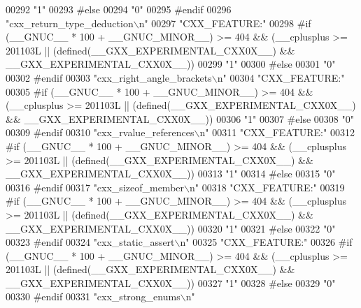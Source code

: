 \begin{DoxyCode}
00292 \textcolor{stringliteral}{"1"}
00293 \textcolor{preprocessor}{#else}
00294 \textcolor{stringliteral}{"0"}
00295 \textcolor{preprocessor}{#endif}
00296 \textcolor{stringliteral}{"cxx\_return\_type\_deduction\(\backslash\)n"}
00297 \textcolor{stringliteral}{"CXX\_FEATURE:"}
00298 \textcolor{preprocessor}{#if (\_\_GNUC\_\_ * 100 + \_\_GNUC\_MINOR\_\_) >= 404 && (\_\_cplusplus >= 201103L ||
       (defined(\_\_GXX\_EXPERIMENTAL\_CXX0X\_\_) && \_\_GXX\_EXPERIMENTAL\_CXX0X\_\_))}
00299 \textcolor{stringliteral}{"1"}
00300 \textcolor{preprocessor}{#else}
00301 \textcolor{stringliteral}{"0"}
00302 \textcolor{preprocessor}{#endif}
00303 \textcolor{stringliteral}{"cxx\_right\_angle\_brackets\(\backslash\)n"}
00304 \textcolor{stringliteral}{"CXX\_FEATURE:"}
00305 \textcolor{preprocessor}{#if (\_\_GNUC\_\_ * 100 + \_\_GNUC\_MINOR\_\_) >= 404 && (\_\_cplusplus >= 201103L ||
       (defined(\_\_GXX\_EXPERIMENTAL\_CXX0X\_\_) && \_\_GXX\_EXPERIMENTAL\_CXX0X\_\_))}
00306 \textcolor{stringliteral}{"1"}
00307 \textcolor{preprocessor}{#else}
00308 \textcolor{stringliteral}{"0"}
00309 \textcolor{preprocessor}{#endif}
00310 \textcolor{stringliteral}{"cxx\_rvalue\_references\(\backslash\)n"}
00311 \textcolor{stringliteral}{"CXX\_FEATURE:"}
00312 \textcolor{preprocessor}{#if (\_\_GNUC\_\_ * 100 + \_\_GNUC\_MINOR\_\_) >= 404 && (\_\_cplusplus >= 201103L ||
       (defined(\_\_GXX\_EXPERIMENTAL\_CXX0X\_\_) && \_\_GXX\_EXPERIMENTAL\_CXX0X\_\_))}
00313 \textcolor{stringliteral}{"1"}
00314 \textcolor{preprocessor}{#else}
00315 \textcolor{stringliteral}{"0"}
00316 \textcolor{preprocessor}{#endif}
00317 \textcolor{stringliteral}{"cxx\_sizeof\_member\(\backslash\)n"}
00318 \textcolor{stringliteral}{"CXX\_FEATURE:"}
00319 \textcolor{preprocessor}{#if (\_\_GNUC\_\_ * 100 + \_\_GNUC\_MINOR\_\_) >= 404 && (\_\_cplusplus >= 201103L ||
       (defined(\_\_GXX\_EXPERIMENTAL\_CXX0X\_\_) && \_\_GXX\_EXPERIMENTAL\_CXX0X\_\_))}
00320 \textcolor{stringliteral}{"1"}
00321 \textcolor{preprocessor}{#else}
00322 \textcolor{stringliteral}{"0"}
00323 \textcolor{preprocessor}{#endif}
00324 \textcolor{stringliteral}{"cxx\_static\_assert\(\backslash\)n"}
00325 \textcolor{stringliteral}{"CXX\_FEATURE:"}
00326 \textcolor{preprocessor}{#if (\_\_GNUC\_\_ * 100 + \_\_GNUC\_MINOR\_\_) >= 404 && (\_\_cplusplus >= 201103L ||
       (defined(\_\_GXX\_EXPERIMENTAL\_CXX0X\_\_) && \_\_GXX\_EXPERIMENTAL\_CXX0X\_\_))}
00327 \textcolor{stringliteral}{"1"}
00328 \textcolor{preprocessor}{#else}
00329 \textcolor{stringliteral}{"0"}
00330 \textcolor{preprocessor}{#endif}
00331 \textcolor{stringliteral}{"cxx\_strong\_enums\(\backslash\)n"}

\end{DoxyCode}

